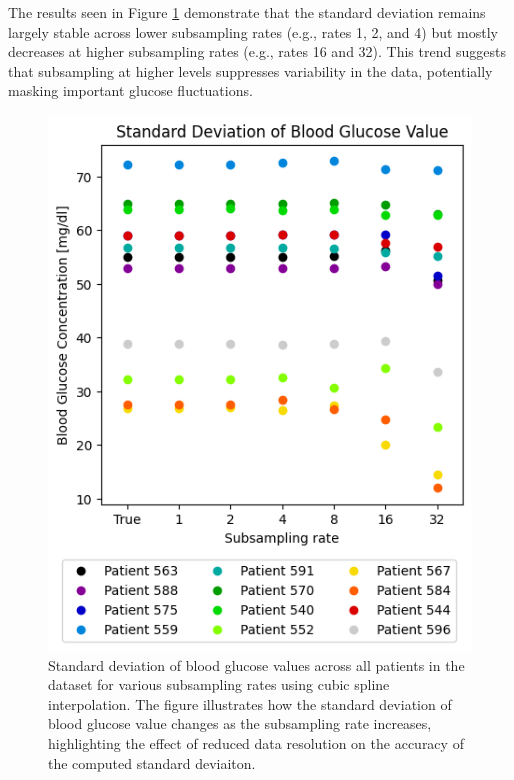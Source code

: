The results seen in Figure \ref{fig:patients_std} demonstrate that the standard deviation remains largely stable across lower subsampling rates (e.g., rates 1, 2, and 4) but mostly decreases at higher subsampling rates (e.g., rates 16 and 32). This trend suggests that subsampling at higher levels suppresses variability in the data, potentially masking important glucose fluctuations.
\begin{figure}[h] %
	\centering
	\includegraphics[width=\linewidth]{Figures/all_patients_std_cbg_values.png} %
	\caption{Standard deviation of blood glucose values across all patients in the dataset for various subsampling rates using cubic spline interpolation. The figure illustrates how the standard deviation of blood glucose value changes as the subsampling rate increases, highlighting the effect of reduced data resolution on the accuracy of the computed standard deviaiton.}
	\label{fig:patients_std}  %
\end{figure}

